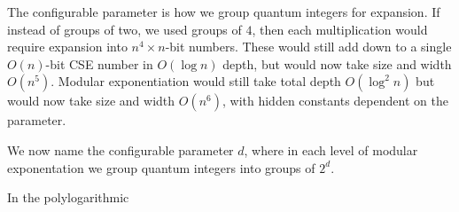 The configurable parameter is how we group quantum integers for
expansion. If instead of groups of two, we used groups of
$4$, then each multiplication would require expansion
into $n^4 \times n$-bit numbers. These would still add down to
a single $O(n)$-bit CSE number in $O(\log n)$ depth, but
would now take size and width $O(n^5)$. Modular exponentiation
would still take total depth $O(\log^2 n)$ but would now take
size and width $O(n^6)$, with hidden constants dependent on
the parameter.

We now name the configurable parameter $d$, where in each level
of modular exponentation we group quantum integers into groups of
$2^d$.

In the polylogarithmic
